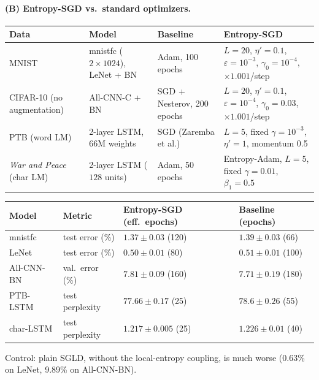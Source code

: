 \documentclass[11pt]{article}
\theoremstyle{plain}
\begin{document}
\paragraph{(B) Entropy-SGD vs.\ standard optimizers.}
\begin{center}\small
\begin{tabularx}{\textwidth}{@{}p{2.3cm}p{2.9cm}p{3.0cm}L@{}}
\toprule
\textbf{Data} & \textbf{Model} & \textbf{Baseline} & \textbf{Entropy-SGD} \\
\midrule
MNIST & mnistfc ($2\times1024$), LeNet + BN & Adam, 100 epochs & $L{=}20$, $\eta'{=}0.1$, $\varepsilon{=}10^{-3}$, $\gamma_0{=}10^{-4}$, $\times1.001$/step \\
CIFAR-10 (no augmentation) & All-CNN-C + BN & SGD + Nesterov, 200 epochs & $L{=}20$, $\eta'{=}0.1$, $\varepsilon{=}10^{-4}$, $\gamma_0{=}0.03$, $\times1.001$/step \\
PTB (word LM) & 2-layer LSTM, 66M weights & SGD (Zaremba et al.) & $L{=}5$, fixed $\gamma{=}10^{-3}$, $\eta'{=}1$, momentum 0.5 \\
\emph{War and Peace} (char LM) & 2-layer LSTM ($128$ units) & Adam, 50 epochs & Entropy-Adam, $L{=}5$, fixed $\gamma{=}0.01$, $\beta_1{=}0.5$ \\
\bottomrule
\end{tabularx}
\end{center}

\begin{center}\small
\begin{tabular}{@{}llll@{}}
\toprule
\textbf{Model} & \textbf{Metric} & \textbf{Entropy-SGD (eff.\ epochs)} & \textbf{Baseline (epochs)} \\
\midrule
mnistfc     & test error (\%)  & $1.37 \pm 0.03$ (120)  & $1.39 \pm 0.03$ (66) \\
LeNet       & test error (\%)  & $0.50 \pm 0.01$ (80)   & $0.51 \pm 0.01$ (100) \\
All-CNN-BN  & val.\ error (\%) & $7.81 \pm 0.09$ (160)  & $7.71 \pm 0.19$ (180) \\
PTB-LSTM    & test perplexity  & $77.66 \pm 0.17$ (25)  & $78.6 \pm 0.26$ (55) \\
char-LSTM   & test perplexity  & $1.217 \pm 0.005$ (25) & $1.226 \pm 0.01$ (40) \\
\bottomrule
\end{tabular}
\end{center}

Control: plain SGLD, without the local-entropy coupling, is much worse (0.63\% on LeNet, 9.89\% on All-CNN-BN).
\end{document}
